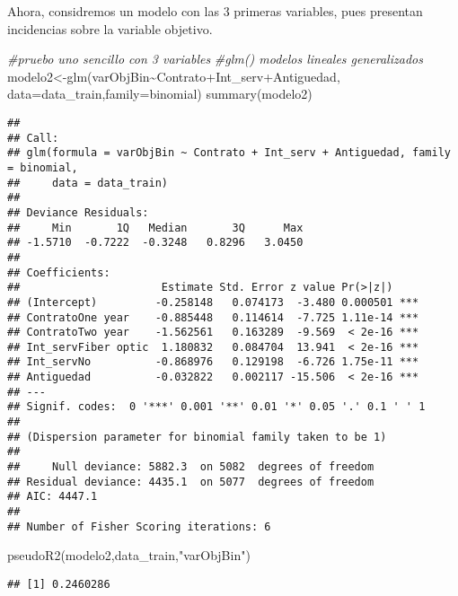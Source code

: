 \documentclass[
]{article}
\newenvironment{Shaded}{\begin{snugshade}}{\end{snugshade}}
\newcommand{\AttributeTok}[1]{\textcolor[rgb]{0.77,0.63,0.00}{#1}}
\newcommand{\CommentTok}[1]{\textcolor[rgb]{0.56,0.35,0.01}{\textit{#1}}}
\newcommand{\FunctionTok}[1]{\textcolor[rgb]{0.00,0.00,0.00}{#1}}
\newcommand{\NormalTok}[1]{#1}
\newcommand{\OtherTok}[1]{\textcolor[rgb]{0.56,0.35,0.01}{#1}}
\newcommand{\SpecialCharTok}[1]{\textcolor[rgb]{0.00,0.00,0.00}{#1}}
\newcommand{\StringTok}[1]{\textcolor[rgb]{0.31,0.60,0.02}{#1}}
\begin{document}
Ahora, considremos un modelo con las 3 primeras variables, pues
presentan incidencias sobre la variable objetivo.

\begin{Shaded}
\begin{Highlighting}[]
\CommentTok{\#pruebo uno sencillo con 3 variables}
\CommentTok{\#glm() modelos lineales generalizados }
\NormalTok{modelo2}\OtherTok{\textless{}{-}}\FunctionTok{glm}\NormalTok{(varObjBin}\SpecialCharTok{\textasciitilde{}}\NormalTok{Contrato}\SpecialCharTok{+}\NormalTok{Int\_serv}\SpecialCharTok{+}\NormalTok{Antiguedad,}
             \AttributeTok{data=}\NormalTok{data\_train,}\AttributeTok{family=}\NormalTok{binomial)}
\FunctionTok{summary}\NormalTok{(modelo2)}
\end{Highlighting}
\end{Shaded}

\begin{verbatim}
## 
## Call:
## glm(formula = varObjBin ~ Contrato + Int_serv + Antiguedad, family = binomial, 
##     data = data_train)
## 
## Deviance Residuals: 
##     Min       1Q   Median       3Q      Max  
## -1.5710  -0.7222  -0.3248   0.8296   3.0450  
## 
## Coefficients:
##                      Estimate Std. Error z value Pr(>|z|)    
## (Intercept)         -0.258148   0.074173  -3.480 0.000501 ***
## ContratoOne year    -0.885448   0.114614  -7.725 1.11e-14 ***
## ContratoTwo year    -1.562561   0.163289  -9.569  < 2e-16 ***
## Int_servFiber optic  1.180832   0.084704  13.941  < 2e-16 ***
## Int_servNo          -0.868976   0.129198  -6.726 1.75e-11 ***
## Antiguedad          -0.032822   0.002117 -15.506  < 2e-16 ***
## ---
## Signif. codes:  0 '***' 0.001 '**' 0.01 '*' 0.05 '.' 0.1 ' ' 1
## 
## (Dispersion parameter for binomial family taken to be 1)
## 
##     Null deviance: 5882.3  on 5082  degrees of freedom
## Residual deviance: 4435.1  on 5077  degrees of freedom
## AIC: 4447.1
## 
## Number of Fisher Scoring iterations: 6
\end{verbatim}

\begin{Shaded}
\begin{Highlighting}[]
\FunctionTok{pseudoR2}\NormalTok{(modelo2,data\_train,}\StringTok{"varObjBin"}\NormalTok{)}
\end{Highlighting}
\end{Shaded}

\begin{verbatim}
## [1] 0.2460286
\end{verbatim}
\end{document}
